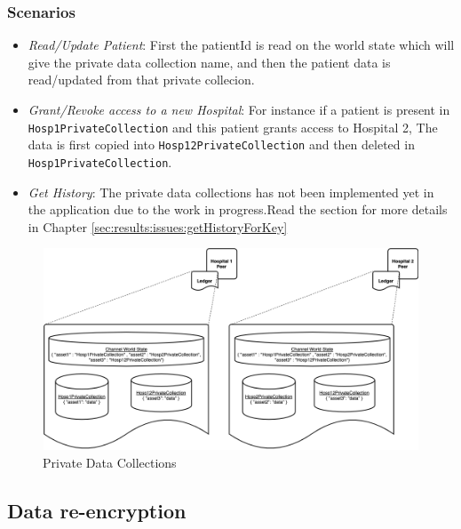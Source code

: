 \subsubsection{Scenarios}
\begin{itemize}
    \item \emph{Read/Update Patient}: First the patientId is read on the world state which will give the private data collection name, and then the patient data is read/updated from that private collecion.
    \item \emph{Grant/Revoke access to a new Hospital}: For instance if a patient is present in \lstinline{Hosp1PrivateCollection} and this patient grants access to Hospital 2, The data is first copied into \lstinline{Hosp12PrivateCollection} and then deleted in \lstinline{Hosp1PrivateCollection}.
    \item \emph{Get History}: The private data collections has not been implemented yet in the application due to the work in progress.Read the section for more details in Chapter \ref{sec:results:issues:getHistoryForKey}
\end{itemize}

\begin{figure}[htbp]
 \centering
 \includegraphics[width=1\textwidth, height=6cm]{gfx/figures/PrivateChannel.png}
 \caption{Private Data Collections}
 \label{fig:chapter03:privateCollection}
\end{figure}

\subsection{Data re-encryption}

